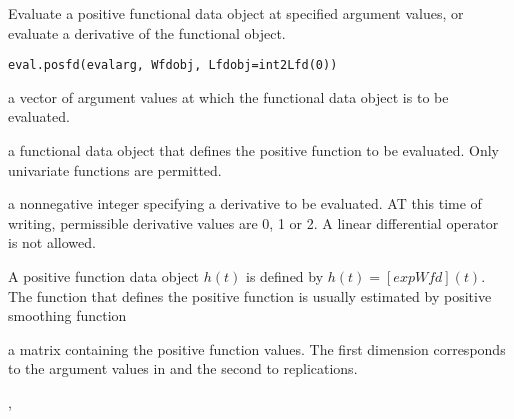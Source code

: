 \begin{Description}\relax
Evaluate a positive functional data object at specified argument values,
or evaluate a derivative of the functional object.
\end{Description}
\begin{Usage}
\begin{verbatim}
eval.posfd(evalarg, Wfdobj, Lfdobj=int2Lfd(0))
\end{verbatim}
\end{Usage}
\begin{Arguments}
\begin{ldescription}
\item[\code{evalarg}] a vector of argument values at which the functional data object is to be
evaluated.

\item[\code{Wfdobj}] a functional data object that defines the positive function to be
evaluated.  Only univariate functions are permitted.

\item[\code{Lfdobj}] a nonnegative integer specifying a derivative to be evaluated.  AT
this time of writing, permissible derivative values are 0, 1 or 2.
A linear differential operator is not allowed.

\end{ldescription}
\end{Arguments}
\begin{Details}\relax
A positive function data object $h(t)$ is defined by $h(t) =[exp Wfd](t)$.
The function  that defines the positive function is
usually estimated by positive smoothing function
\end{Details}
\begin{Value}
a matrix containing the positive function
values.  The first dimension corresponds to the argument values in
 and
the second to replications.
\end{Value}
\begin{SeeAlso}\relax
{}, 
\end{SeeAlso}

